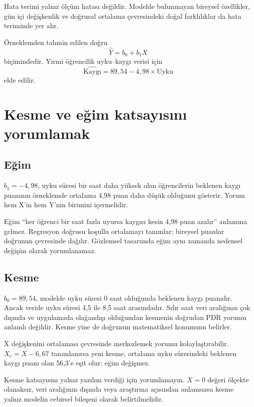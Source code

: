 Hata terimi yalnız ölçüm hatası değildir. Modelde bulunmayan bireysel
özellikler, gün içi değişkenlik ve doğrusal ortalama çevresindeki doğal
farklılıklar da hata teriminde yer alır.

Örneklemden tahmin edilen doğru
\[
\widehat{Y}=b_0+b_1X
\]
biçimindedir. Yirmi öğrencilik uyku--kaygı verisi için
\[
\widehat{\text{Kaygı}}=89{,}54-4{,}98\times\text{Uyku}
\]
elde edilir.

\section{Kesme ve eğim katsayısını yorumlamak}

\subsection{Eğim}

$b_1=-4{,}98$, uyku süresi bir saat daha yüksek olan öğrencilerin beklenen
kaygı puanının örneklemde ortalama 4,98 puan daha düşük olduğunu gösterir.
Yorum hem X'in hem Y'nin birimini içermelidir.

Eğim ``her öğrenci bir saat fazla uyursa kaygısı kesin 4,98 puan azalır''
anlamına gelmez. Regresyon doğrusu koşullu ortalamayı tanımlar; bireysel
puanlar doğrunun çevresinde dağılır. Gözlemsel tasarımda eğim aynı zamanda
nedensel değişim olarak yorumlanamaz.

\subsection{Kesme}

$b_0=89{,}54$, modelde uyku süresi 0 saat olduğunda beklenen kaygı puanıdır.
Ancak veride uyku süresi 4,5 ile 8,5 saat arasındadır. Sıfır saat veri
aralığının çok dışında ve uygulamada olağandışı olduğundan kesmenin doğrudan
PDR yorumu anlamlı değildir. Kesme yine de doğrunun matematiksel konumunu
belirler.

X değişkenini ortalaması çevresinde merkezlemek yorumu kolaylaştırabilir.
$X_c=X-6{,}67$ tanımlanırsa yeni kesme, ortalama uyku süresindeki beklenen
kaygı puanı olan 56,3'e eşit olur; eğim değişmez.

\begin{mistakebox}
Kesme katsayısını yalnız yazılım verdiği için yorumlamayın. $X=0$ değeri
ölçekte olanaksız, veri aralığının dışında veya araştırma açısından anlamsızsa
kesme yalnız modelin cebirsel bileşeni olarak belirtilmelidir.
\end{mistakebox}

